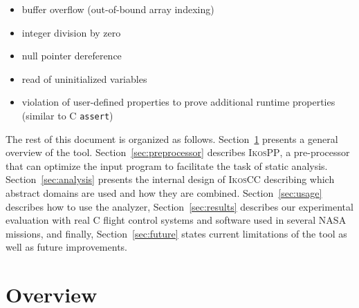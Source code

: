 \documentclass[a4]{article}
\newcommand{\ignore}[1]{}
\newcommand{\ikoscc}{\textsc{IkosCC}\xspace}
\newcommand{\ikospp}{\textsc{IkosPP}\xspace}
\begin{document}
\begin{itemize} 
\item buffer overflow (out-of-bound array indexing)
\item integer division by zero
\item null pointer dereference
\item read of uninitialized variables
\item violation of user-defined properties to prove additional runtime
  properties (similar to C \texttt{assert})
\end{itemize}


The rest of this document is organized as
follows. Section~\ref{sec:overview} presents a general overview of the
tool. Section~\ref{sec:preprocessor} describes \ikospp, a
pre-processor that can optimize the input program to facilitate the
task of static analysis. Section~\ref{sec:analysis} presents the
internal design of \ikoscc describing which abstract domains are used
and how they are combined. \ignore{, as well as, some key
  implementation details. Section~\ref{sec:related} describes some
  related work.}  Section~\ref{sec:usage} describes how to use the
analyzer, Section~\ref{sec:results} describes our experimental
evaluation with real C flight control systems and software used in
several NASA missions, and finally, Section~\ref{sec:future} states
current limitations of the tool as well as future improvements.

\section{Overview}
\label{sec:overview}
\end{document}
